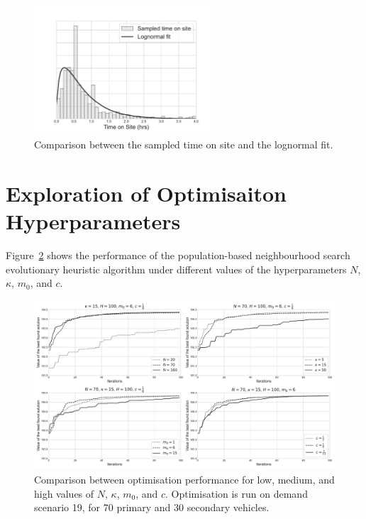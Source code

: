 \documentclass[preprint,12pt]{elsarticle}
\begin{document}
\begin{figure}[ht]
\centering
  \includegraphics[width=0.6\textwidth]{img/time_on_site_fit.pdf}
    \caption{Comparison between the sampled time on site and the lognormal
             fit.}
  \label{fig:lognorm_fit}
\end{figure}


\section{Exploration of Optimisaiton Hyperparameters}\label{apx:hyperparameters}
Figure~\ref{fig:hyperparameters_exploration} shows the performance of the
population-based neighbourhood search evolutionary heuristic algorithm under
different values of the hyperparameters $N$, $\kappa$, $m_0$, and $c$.

\begin{figure}[ht]
\centering
\includegraphics[width=\textwidth]{img/hyperparameter_exploration}
\caption{Comparison between optimisation performance for low, medium, and high
values of $N$, $\kappa$, $m_0$, and $c$. Optimisation is run on demand
scenario 19, for 70 primary and 30 secondary vehicles.}
\label{fig:hyperparameters_exploration}
\end{figure}





\end{document}
